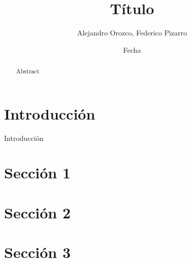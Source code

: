 \documentclass[12pt, a4paper]{article}
\title{Título}
\author{Alejandro Orozco, Federico Pizarro}
\date{Fecha}
\begin{document}
\setlength{\parskip}{1em}

\captionsetup[table]{name=Tabla}

\maketitle

\begin{abstract}
    
Abstract

\end{abstract}

\section{Introducción}

Introducción

\section{Sección 1}

\section{Sección 2}

\section{Sección 3}
\end{document}
